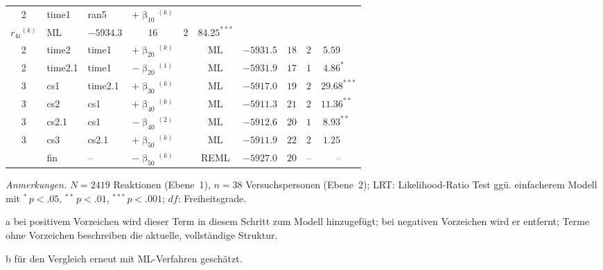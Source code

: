 \begin{table}[bth]
\begin{threeparttable}
\begin{tabularx}{\textwidth}{CllCCccCCC}
					2 & time1 &  ran5 & $+\upbeta_{10}{}^{(k)}$  &
					\begin{tabular}[c]{@{}l@{}}$r_{0i}{}^{(k)}$\\ $r_{4i}{}^{(k)}$\end{tabular}  & ML &
					 &   &  &  \\ 
					2 & time2 & time1 & $+\upbeta_{20}{}^{(k)}$ & \ditto  & ML &
					 &   &  &  \\ 
					2 & time2.1 & time1 & $-\upbeta_{20}{}^{(1)}$ & \ditto  & ML &
					 &   &  &  \\
					3 & cs1 & time2.1 & $+\upbeta_{30}{}^{(k)}$ &\ditto  & ML &
					 &   &  &  \\
					3 & cs2 & cs1 & $+\upbeta_{40}{}^{(k)}$ & \ditto  & ML &
					 &   &  &  \\
					3 & cs2.1 & cs1 & $-\upbeta_{40}{}^{(2)}$ & \ditto  & ML &
					 &   &  &  \\ 
					3 & cs3 & cs2.1 & $+\upbeta_{50}{}^{(k)}$ &
					\ditto  & ML &
					 &   &  &  \\ %
					& fin & -- & $-\upbeta_{50}{}^{(k)}$ &
					\ditto  & REML &
					 &   & \multicolumn{1}{c}{--} &  \\ [-0.2em]
					\bottomrule
				\end{tabularx}
				\begin{tablenotes}
					\footnotesize{
						\item \textit{Anmerkungen.} $N=2419$ Reaktionen (Ebene~1), $n=38$ Versuchspersonen (Ebene~2); LRT: Likelihood-Ratio Test ggü. einfacherem Modell mit ${}^{*}\, p<.05$, ${}^{**}\, p<.01$, ${}^{***}\, p<.001$; $df$: Freiheitsgrade.\\
						\item[a] bei positivem Vorzeichen wird dieser Term in diesem Schritt zum Modell hinzugefügt; bei negativen Vorzeichen wird er entfernt; Terme ohne Vorzeichen beschreiben die aktuelle, vollständige Struktur.
						\item[b] für den Vergleich erneut mit ML-Verfahren geschätzt.}
				\end{tablenotes}
			\end{threeparttable}
		\end{table}
	
